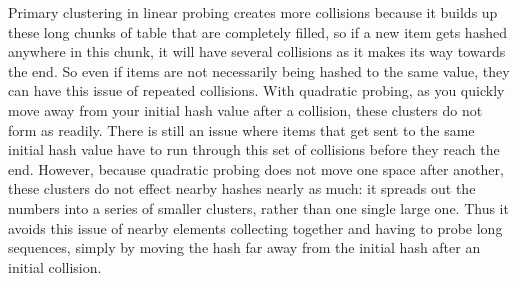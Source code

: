 \documentclass[12pt,a4paper]{article}
\begin{document}
Primary clustering in linear probing creates more collisions because it builds up these long chunks of table that are completely filled, so if a new item gets hashed anywhere in this chunk, it will have several collisions as it makes its way towards the end. So even if items are not necessarily being hashed to the same value, they can have this issue of repeated collisions. 
With quadratic probing, as you quickly move away from your initial hash value after a collision, these clusters do not form as readily. There is still an issue where items that get sent to the same initial hash value have to run through this set of collisions before they reach the end. However, because quadratic probing does not move one space after another, these clusters do not effect nearby hashes nearly as much: it spreads out the numbers into a series of smaller clusters, rather than one single large one. Thus it avoids this issue of nearby elements collecting together and having to probe long sequences, simply by moving the hash far away from the initial hash after an initial collision.
\end{document}
